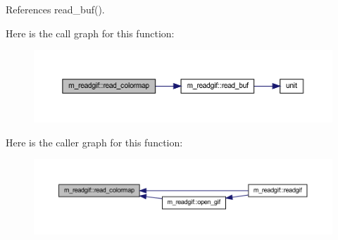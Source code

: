 References read\+\_\+buf().

Here is the call graph for this function\+:
\nopagebreak
\begin{figure}[H]
\begin{center}
\leavevmode
\includegraphics[width=350pt]{namespacem__readgif_aabaf13dcb1e665b2524049e5661ca4b6_cgraph}
\end{center}
\end{figure}
Here is the caller graph for this function\+:
\nopagebreak
\begin{figure}[H]
\begin{center}
\leavevmode
\includegraphics[width=350pt]{namespacem__readgif_aabaf13dcb1e665b2524049e5661ca4b6_icgraph}
\end{center}
\end{figure}
\mbox{\label{namespacem__readgif_a4af978d944dbefb3ddeb81cd8c54d0f9}} 
